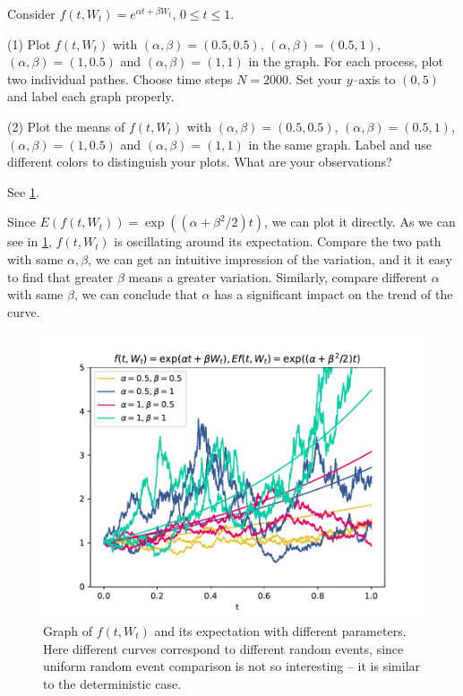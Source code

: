 \problem
\begin{question}
    Consider $f(t,W_t)=e^{\alpha t+\beta W_t}$, $0\leq t\leq1$.

    (1)  Plot $f(t,W_t)$ with $(\alpha,\beta)=(0.5,0.5)$, $(\alpha,\beta)=(0.5,1)$, $(\alpha,\beta)=(1,0.5)$ and $(\alpha,\beta)=(1,1)$ in the graph.  For each process, plot two individual pathes.  Choose time steps $N=2000$.  Set your $y$--axis to $(0,5)$ and label each graph properly.

    (2)  Plot the means of $f(t,W_t)$ with $(\alpha,\beta)=(0.5,0.5)$, $(\alpha,\beta)=(0.5,1)$, $(\alpha,\beta)=(1,0.5)$ and $(\alpha,\beta)=(1,1)$ in the same graph.  Label and use different colors to distinguish your plots.  What are your observations?
\end{question}
\begin{subproblem}[(\arabic*)]
    \item See \cref{fig:GBM}.
    \item Since $E(f(t,W_t))=\exp((\alpha+\beta^2/2)t)$, we can
    plot it directly. As we can see in \cref{fig:GBM},
    $f(t,W_t)$ is oscillating around its expectation.
    Compare the two path with same $\alpha,\beta$, we can
    get an intuitive impression of the variation, and it
    it easy to find that
    greater $\beta$ means a greater variation.
    Similarly, compare different $\alpha$ with same $\beta$,
    we can conclude that $\alpha$ has a significant impact on 
    the trend of the curve.

    \begin{figure}[h]
        \centering
        \includegraphics[width=\textwidth]{GBM}
        \caption{Graph of $f(t,W_t)$ and its expectation with different
        parameters. Here different curves correspond to different random events,
        since uniform random event comparison is not so interesting -- it
        is similar to the deterministic case.}
        \label{fig:GBM}
    \end{figure}
\end{subproblem}

